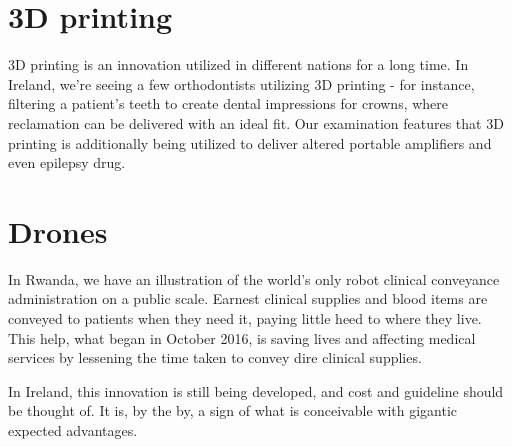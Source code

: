 \documentclass[12pt]{article}
\begin{document}
\section{3D printing}

3D printing is an innovation utilized in different nations for a long time. In Ireland, we're seeing a few orthodontists utilizing 3D printing - for instance, filtering a patient's teeth to create dental impressions for crowns, where reclamation can be delivered with an ideal fit. Our examination features that 3D printing is additionally being utilized to deliver altered portable amplifiers and even epilepsy drug.


\section{Drones}

In Rwanda, we have an illustration of the world's only robot clinical conveyance administration on a public scale. Earnest clinical supplies and blood items are conveyed to patients when they need it, paying little heed to where they live. This help, what began in October 2016, is saving lives and affecting medical services by lessening the time taken to convey dire clinical supplies.

In Ireland, this innovation is still being developed, and cost and guideline should be thought of. It is, by the by, a sign of what is conceivable with gigantic expected advantages.
\end{document}
